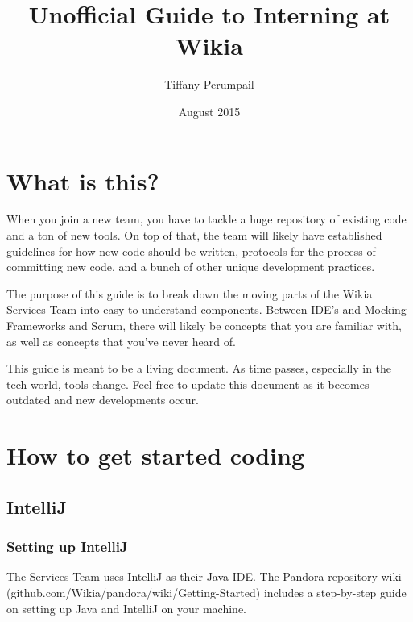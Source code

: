\documentclass[oneside]{book}
\begin{document}
\title{Unofficial Guide to Interning at Wikia}
\author{Tiffany Perumpail}
\date{August 2015}
\maketitle
\tableofcontents
\chapter{What is this?}
When you join a new team, you have to tackle a huge repository of existing code and a ton of new tools. On top of that, the team will likely have established guidelines for how new code should be written, protocols for the process of committing new code, and a bunch of other unique development practices.\par
The purpose of this guide is to break down the moving parts of the Wikia Services Team into easy-to-understand components. Between IDE's and Mocking Frameworks and Scrum, there will likely be concepts that you are familiar with, as well as concepts that you've never heard of.\par
This guide is meant to be a living document. As time passes, especially in the tech world, tools change. Feel free to update this document as it becomes outdated and new developments occur.
\chapter{How to get started coding}
\section{IntelliJ}
\subsection{Setting up IntelliJ}
The Services Team uses IntelliJ as their Java IDE. The Pandora repository wiki (github.com/Wikia/pandora/wiki/Getting-Started) includes a step-by-step guide on setting up Java and IntelliJ on your machine.
\end{document}
